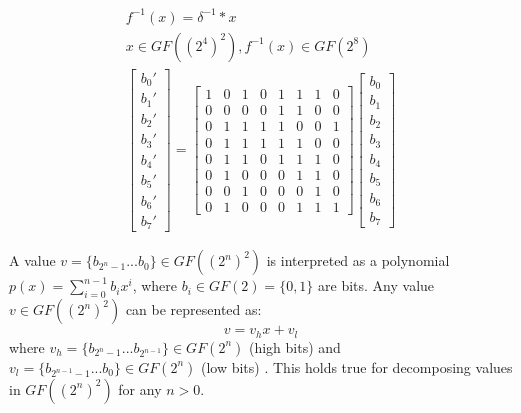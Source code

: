 \begin{equation}
\begin{gathered}
\label{eq:iso_map_rev}
f^{-1}(x) = \delta^{-1} * x\\
x \in GF((2^4)^2), f^{-1}(x) \in GF(2^8) \\
\begin{bmatrix}
b_0'\\b_1'\\b_2'\\b_3'\\b_4'\\b_5'\\b_6'\\b_7'
\end{bmatrix}
=
\begin{bmatrix}
    1 & 0 & 1 & 0 & 1 & 1 & 1 & 0 \\
    0 & 0 & 0 & 0 & 1 & 1 & 0 & 0 \\
    0 & 1 & 1 & 1 & 1 & 0 & 0 & 1 \\
    0 & 1 & 1 & 1 & 1 & 1 & 0 & 0 \\
    0 & 1 & 1 & 0 & 1 & 1 & 1 & 0 \\
    0 & 1 & 0 & 0 & 0 & 1 & 1 & 0 \\
    0 & 0 & 1 & 0 & 0 & 0 & 1 & 0 \\
    0 & 1 & 0 & 0 & 0 & 1 & 1 & 1
\end{bmatrix}
\begin{bmatrix}
b_0\\b_1\\b_2\\b_3\\b_4\\b_5\\b_6\\b_7
\end{bmatrix}
\end{gathered}
\end{equation}

A value $v = \{b_{2^n-1}...b_0\} \in GF((2^n)^2)$ is interpreted as a polynomial $p(x) = \sum_{i=0}^{n-1} b_ix^i$, where $b_i \in GF(2) = \{0, 1\}$ are bits. Any value $v \in GF((2^n)^2)$ can be represented as:
\begin{equation}
\label{eq:poly_repr}
v = v_hx + v_l
\end{equation}
where $v_h = \{b_{2^n-1}...b_{2^{n-1}}\} \in GF(2^n)$ (high bits) and $v_l = \{b_{2^{n-1}-1}...b_0\} \in GF(2^n)$ (low bits) \cite{vlsi}. This holds true for decomposing values in $GF((2^n)^2)$ for any $n > 0$.


